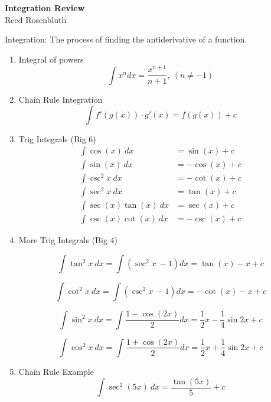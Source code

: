 \documentclass{article}
\begin{document}
\begingroup  
  \centering
  \LARGE {\bf Integration Review}\\
  \large Reed Rosenbluth\par
\endgroup

\quad

Integration: The process of finding the antiderivative of a function.

\begin{enumerate}

\item Integral of powers
\begin{equation*}
\int {x^n } dx = \frac{x^{n + 1} }{n + 1}, \ (n \ne  - 1)
\end{equation*}

\item Chain Rule Integration
\begin{equation*}
\int {f'(g(x)) \cdot g'(x) }  = f(g(x)) + c
\end{equation*}



\item Trig Integrals (Big 6)
\begin{align*}
\int \cos (x) \ dx &= \sin (x) + c \\[1em]
\int \sin (x) \ dx &= - \cos (x) + c \\[1em]
\int \csc^2 x \ dx &= -\cot (x) + c \\[1em]
\int \sec^2 x \ dx &= \tan (x) + c \\[1em]
\int \sec (x) \tan (x) \ dx &= \sec (x) + c \\[1em]
\int \csc (x) \cot (x) \ dx &= - \csc (x) + c 
\end{align*}

\item More Trig Integrals (Big 4)

\begin{equation*}
\int \tan^2 x \ dx = \int (\sec^2 x \ - 1) dx = \tan (x) - x + c
\end{equation*}

\begin{equation*}
\int \cot^2 x \ dx = \int (\csc^2 x \ - 1) dx = - \cot (x) - x + c
\end{equation*}

\begin{equation*}
\int \sin^2 x \ dx = \int \frac{1-\cos (2x)}{2} dx = \frac{1}{2}x - \frac{1}{4}\sin 2x + c
\end{equation*}

\begin{equation*}
\int \cos^2 x \ dx = \int \frac{1+\cos (2x)}{2} dx = \frac{1}{2}x + \frac{1}{4}\sin 2x + c
\end{equation*}

\item Chain Rule Example
\begin{equation*}
\int \sec^2 (5x) \ dx = \frac{\tan (5x)}{5} + c
\end{equation*}




\end{enumerate}
\end{document}
